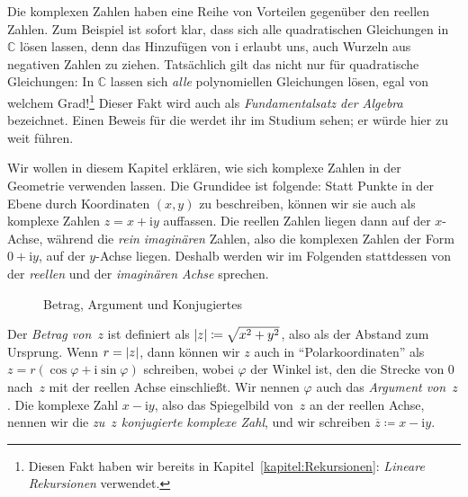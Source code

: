 Die komplexen Zahlen haben eine Reihe von Vorteilen gegenüber den reellen Zahlen. Zum Beispiel ist sofort klar, dass sich alle quadratischen Gleichungen in $\mathbb C$ lösen lassen, denn das Hinzufügen von $\mathrm{i}$ erlaubt uns, auch Wurzeln aus negativen Zahlen zu ziehen. Tatsächlich gilt das nicht nur für quadratische Gleichungen: In $\mathbb C$ lassen sich \emph{alle} polynomiellen Gleichungen lösen, egal von welchem Grad!\footnote{Diesen Fakt haben wir bereits in Kapitel~\ref{kapitel:Rekursionen}: \emph{Lineare Rekursionen} verwendet.} Dieser Fakt wird auch als \emph{Fundamentalsatz der Algebra} bezeichnet. Einen Beweis für die werdet ihr im Studium sehen; er würde hier zu weit führen.

Wir wollen in diesem Kapitel erklären, wie sich komplexe Zahlen in der Geometrie verwenden lassen. Die Grundidee ist folgende: Statt Punkte in der Ebene durch Koordinaten $(x,y)$ zu beschreiben, können wir sie auch als komplexe Zahlen $z=x+\mathrm{i} y$ auffassen. Die reellen Zahlen liegen dann auf der $x$-Achse, während die \emph{rein imaginären} Zahlen, also die komplexen Zahlen der Form $0+\mathrm{i} y$, auf der $y$-Achse liegen. Deshalb werden wir im Folgenden stattdessen von der \emph{reellen} und der \emph{imaginären Achse} sprechen.
	
\begin{wrapfigure}{r}{0.25\textwidth}
	\centering\vspace{-0.44cm}
	Betrag, Argument und Konjugiertes\vspace{-0.5cm}
\end{wrapfigure}
Der \emph{Betrag von~$z$} ist definiert als $\lvert z\rvert\coloneqq \sqrt{x^2+y^2}$, also als der Abstand zum Ursprung. Wenn $r=\lvert z\rvert$, dann können wir $z$ auch in \enquote{Polarkoordinaten} als $z=r(\cos\varphi+\mathrm{i}\sin\varphi)$ schreiben, wobei $\varphi$ der Winkel ist, den die Strecke von $0$ nach~$z$ mit der reellen Achse einschließt. Wir nennen $\varphi$ auch das \emph{Argument von~$z$}. Die komplexe Zahl $x-\mathrm{i} y$, also das Spiegelbild von~$z$ an der reellen Achse, nennen wir die \emph{zu~$z$ konjugierte komplexe Zahl}, und wir schreiben $\overline{z}\coloneqq x-\mathrm{i} y$.

